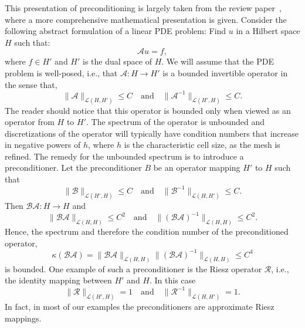 This presentation of preconditioning is largely taken from the
review paper~\citep{MardalWinther11}, where a more comprehensive mathematical
presentation is given. Consider the following abstract formulation
of a linear PDE problem:  
Find $u$ in a Hilbert space $H$ such that: 
\begin{equation}
\mathcal{A} u = f,  
\end{equation}
where $f\in H'$ and $H'$ is the dual space of $H$.  
We will assume that the PDE problem is well-posed, i.e., 
that $\mathcal{A} : H \rightarrow H'$ is a bounded invertible operator in the sense that,  
\begin{equation}
\|\mathcal{A}\|_{\mathcal{L} (H, H')} \le C \quad \mbox{and} \quad  
\|\mathcal{A}^{-1}\|_{\mathcal{L} (H', H)} \le C. 
\end{equation}
The reader should notice that this operator is bounded only when 
viewed as an operator from $H$ to $H'$. 
The spectrum of the operator is unbounded and   
discretizations of the operator will typically have  
condition numbers that increase 
in negative powers of $h$, where $h$ is the
characteristic cell size, as the mesh is refined. 
The remedy for the unbounded spectrum is to introduce a preconditioner. 
Let the preconditioner $B$ be an operator
mapping $H'$ to $H$ such that  
\begin{equation}
\|\mathcal{B}\|_{\mathcal{L}(H', H)} \le C \quad \mbox{and} \quad   
\|\mathcal{B}^{-1}\|_{\mathcal{L}(H, H')} \le C. 
\end{equation}
Then 
$\mathcal{B}\mathcal{A}: H \rightarrow H$ and 
\begin{equation}
\|\mathcal{B}\mathcal{A}\|_{\mathcal{L}(H, H)} \le C^2 \quad \mbox{and} \quad  
\|(\mathcal{B}\mathcal{A})^{-1}\|_{\mathcal{L}(H, H)} \le C^2. 
\end{equation}
Hence, the spectrum and therefore the condition number of the
preconditioned operator, 
\begin{equation}
\kappa(\mathcal{B}\mathcal{A}) = \|\mathcal{B}\mathcal{A}\|_{\mathcal{L}(H, H)} \|(\mathcal{B}\mathcal{A})^{-1}\|_{\mathcal{L}(H, H)} \le C^4  
\end{equation}
is bounded.  One example of such a preconditioner is the Riesz operator $\mathcal{R}$, i.e.,  the identity mapping between $H'$ and $H$.  
In this case 
\begin{equation}
\|\mathcal{R}\|_{\mathcal{L}(H', H)} = 1 \quad \mbox{and} \quad   
\|\mathcal{R}^{-1}\|_{\mathcal{L}(H, H')} = 1. 
\end{equation}
In fact, in most of our examples the preconditioners are approximate Riesz mappings.  

